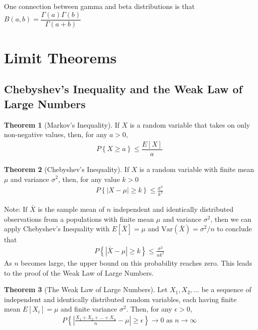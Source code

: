 \documentclass[10pt]{article}
\theoremstyle{definition}
\theoremstyle{theorem}
\newtheorem*{theorem}{Theorem}
\begin{document}
		One connection between gamma and beta distributions is that \(B(a,b)=\dfrac{\Gamma(a)\Gamma(b)}{\Gamma(a+b)}\)
		
		\section{Limit Theorems}
		
		\subsection*{Chebyshev's Inequality and the Weak Law of Large Numbers}
		
		\begin{theorem}[Markov's Inequality]
			If \(X\) is a random variable that takes on only non-negative values, then, for any \(a>0\), 
			\begin{align*}
				P\left\{X\geq a\right\} \leq \dfrac{E[X]}{a}
			\end{align*}
			
		\end{theorem}
		
		\begin{theorem}[Chebyshev's Inequality]
			If \(X\) is a random variable with finite mean \(\mu\) and variance \(\sigma^2\), then, for any value \(k>0\)
			\begin{align*}
				P\left\{| X-\mu | \geq k\right\} \leq \frac{\sigma^2}{k^2}
			\end{align*}
		\end{theorem}
		
		Note: If \(\bar{X}\) is the sample mean of \(n\)  independent and identically distributed observations from a populations with finite mean \(\mu\) and variance \(\sigma^2\), then we can apply Chebyshev's Inequality with \(E[\bar{X}]=\mu\) and \(\text{Var}(\bar{X})=\sigma^2/n\) to conclude that
		\begin{align*}
			P\left\{| \bar{X}-\mu | \geq k\right\} \leq \frac{\sigma^2}{nk^2}
		\end{align*}
		As \(n\) becomes large, the upper bound on this probability reaches zero. This leads to the proof of the Weak Law of Large Numbers.
		
		\begin{theorem}[The Weak Law of Large Numbers]
			Let \(X_1, X_2,\ldots\) be a sequence of independent and identically distributed random variables, each having finite mean \(E[X_i]=\mu\) and finite variance \(\sigma^2\). Then, for any \(\epsilon > 0\),
			\begin{align*}
				P \left\{ \left|\frac{X_1+X_2+\ldots + X_n}{n}-\mu \right| \geq \epsilon \right\} \to 0 \text{ as } n \to \infty
			\end{align*}
		\end{theorem}
		
\end{document}
